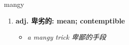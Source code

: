 
\begin{frame}
{\huge mangy}
\begin{center}
\begin{enumerate}\Large
  \item \textbf{adj. 卑劣的: mean; contemptible}
  \begin{itemize}
    \item \em{\Large{a mangy trick 卑鄙的手段}}
  \end{itemize}
\end{enumerate}
\end{center}
\end{frame}
